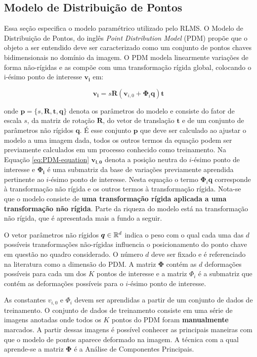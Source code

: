 {\subsection{Modelo de Distribuição de Pontos}

Essa seção especifica o modelo paramétrico utilizado pelo RLMS. O Modelo de Distribuição de Pontos, do inglês  \textit{Point Distribution Model} (PDM) propõe que o objeto a ser entendido deve ser caracterizado como um conjunto de pontos chaves
bidimensionais no domínio da imagem. O PDM modela linearmente variações de forma não-rígidas e as compõe com uma transformação rígida global, colocando o i-ésimo ponto de interesse
$\bm{v_i}$ em:

\begin{equation}
 \bm{v_i} = s \bm{R} ( \bm{v}_{i,0} + \bm{\Phi}_i \bm{q}) \bm{t}
\label{eq:PDM-equation}
\end{equation}
 
onde $\mathbf{p}=\{s,\bm{R},\bm{t},\bm{q}\}$ denota os parâmetros do modelo e consiste do fator de
escala $s$, da matriz de rotação $\bm{R}$, do vetor de translação $\bm{t}$ e de um
conjunto de parâmetros não rígidos $\bm{q}$. É esse conjunto $\mathbf{p}$ que deve ser
calculado ao ajustar o modelo a uma imagem dada, todos os outros termos da
equação podem ser previamente calculados em um processo conhecido como
treinamento.  Na Equação \ref{eq:PDM-equation} $\bm{v_{i,0}}$ denota a posição neutra do $i$-ésimo ponto de interesse e $\bm{\Phi_i}$ é uma submatriz da base de variações
previamente aprendida pertinente ao $i$-ésimo ponto de interesse.  Nesta equação o
termo $\bm{\Phi}_i \bm{q}$ corresponde à transformação não rígida e os outros
termos à transformação rígida. Nota-se que o modelo consiste de \textbf{uma
transformação rígida aplicada a uma transformação não rígida}. Parte da riqueza
do modelo está na transformação não rígida, que é apresentada mais a fundo a
seguir.

O vetor parâmetros não rígidos $\bm{q} \in \mathbb{R} ^d$ indica o peso com o qual
cada uma das $d$ possíveis transformações não-rígidas influencia o posicionamento
do ponto chave em questão no quadro considerado. O número $d$ deve ser fixado e é
referenciado na literatura como a dimensão do PDM. A matriz $\bm{\Phi}$ contém as $d$
deformações possíveis para cada um dos $K$ pontos de interesse e a matriz $\Phi_i$
é a submatriz que contém as deformações possíveis para o $i$-ésimo ponto de
interesse.

As constantes $v_{i,0}$ e $\Phi_i$ devem ser aprendidas a partir de um conjunto
de dados de treinamento. O conjunto de dados de treinamento consiste em uma
série de imagens anotadas onde todos os $K$ pontos do PDM foram
\textbf{manualmente} marcados. A partir dessas imagens é possível conhecer as
principais maneiras com que o modelo de pontos aparece deformado na imagem. A
técnica com a qual aprende-se a matriz $\bm{\Phi}$ é a Análise de Componentes
Principais.

}
